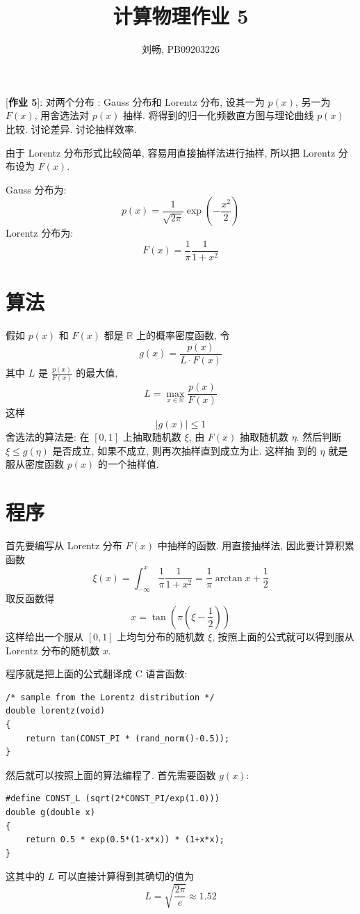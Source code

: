 \documentclass{ctexart}
\begin{document}
\title{计算物理作业 5}
\author{刘畅, PB09203226}
\maketitle

[{\bf 作业 5}]: 对两个分布 : Gauss 分布和 Lorentz 分布, 设其一为 $p(x)$,
另一为 $F(x)$, 用舍选法对 $p(x)$ 抽样. 将得到的归一化频数直方图与理论曲线 $p(x)$
比较. 讨论差异. 讨论抽样效率.

\bigbreak

由于 Lorentz 分布形式比较简单, 容易用直接抽样法进行抽样, 所以把 Lorentz 分布设为 $F(x)$.

Gauss 分布为:
\[
p(x) = \frac{1}{\sqrt{2\pi}}\exp\left(-\frac{x^2}{2}\right)
\]
Lorentz 分布为:
\[
F(x) = \frac{1}{\pi} \frac{1}{1+x^2}
\]

\section{算法}
假如 $p(x)$ 和 $F(x)$ 都是 $\mathbb{R}$ 上的概率密度函数, 令
\[
g(x) = \frac{p(x)}{L\cdot F(x)}
\]
其中 $L$ 是 $\frac{p(x)}{F(x)}$ 的最大值,
\[
L = \max_{x\in\mathbb{R}} \frac{p(x)}{F(x)}
\]
这样
\[
|g(x)| \le 1
\]
舍选法的算法是: 在 $[0,1]$ 上抽取随机数 $\xi$, 由 $F(x)$ 抽取随机数 $\eta$.
然后判断 $\xi\le g(\eta)$ 是否成立, 如果不成立, 则再次抽样直到成立为止. 这样抽
到的 $\eta$ 就是服从密度函数 $p(x)$ 的一个抽样值.

\section{程序}
首先要编写从 Lorentz 分布 $F(x)$ 中抽样的函数. 用直接抽样法, 因此要计算积累函数
\[
\xi(x) = \int^x_{-\infty}\frac{1}{\pi}\frac{1}{1+x^2} = \frac{1}{\pi}\arctan
x + \frac{1}{2}
\]
取反函数得
\[
x = \tan (\pi(\xi-\frac{1}{2}))
\]
这样给出一个服从 $[0,1]$ 上均匀分布的随机数 $\xi$, 按照上面的公式就可以得到服从
Lorentz 分布的随机数 $x$.

程序就是把上面的公式翻译成 C 语言函数:
\begin{verbatim}
/* sample from the Lorentz distribution */
double lorentz(void)
{
    return tan(CONST_PI * (rand_norm()-0.5));
}
\end{verbatim}

然后就可以按照上面的算法编程了. 首先需要函数 $g(x)$:
\begin{verbatim}
#define CONST_L	(sqrt(2*CONST_PI/exp(1.0)))
double g(double x)
{
    return 0.5 * exp(0.5*(1-x*x)) * (1+x*x);
}
\end{verbatim}
这其中的 $L$ 可以直接计算得到其确切的值为
\[
L = \sqrt{\frac{2\pi}{e}} \approx 1.52
\]
\end{document}
